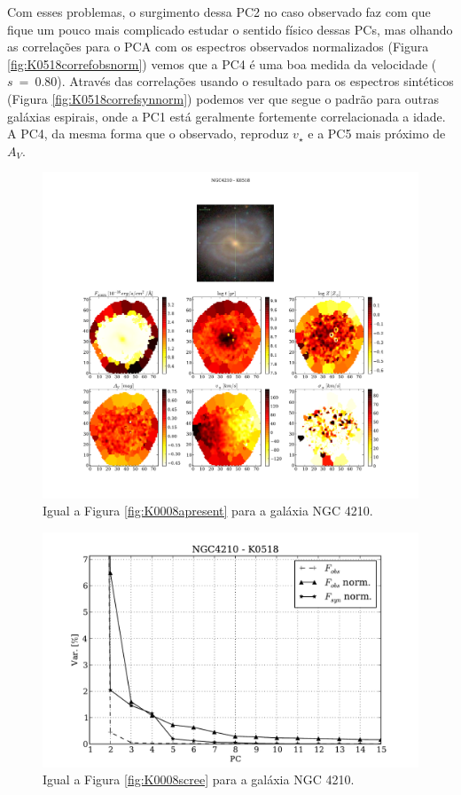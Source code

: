 Com esses problemas, o surgimento dessa PC2 no caso observado faz com que fique um pouco mais complicado estudar o
sentido físico dessas PCs, mas olhando as correlações para o PCA com os espectros observados normalizados (Figura
\ref{fig:K0518correfobsnorm}) vemos que a PC4 é uma boa medida da velocidade ($s\ =\ 0.80$). Através das correlações
usando o resultado para os espectros sintéticos (Figura \ref{fig:K0518correfsynnorm}) podemos ver que segue o padrão
para outras galáxias espirais, onde a PC1 está geralmente fortemente correlacionada a idade. A PC4, da mesma forma que o
observado, reproduz $v_\star$ e a PC5 mais próximo de $A_V$.

\begin{figure}
    \includegraphics[width=1.\textwidth]{figuras/K0518-apresent.pdf}
    \caption[Propriedades f\'isicas da gal\'axia NGC 4210.]
    {Igual a Figura \ref{fig:K0008apresent} para a galáxia NGC 4210.}
    \label{fig:K0518apresent}
\end{figure}

\begin{figure}
    \includegraphics[height=0.33\textheight]{figuras/K0518-screetest.pdf}
    \caption[Scree test comparativo entre 3 PCAs - NGC 4210.]
	{Igual a Figura \ref{fig:K0008scree} para a galáxia NGC 4210.}
    \label{fig:K0518scree}
\end{figure}

